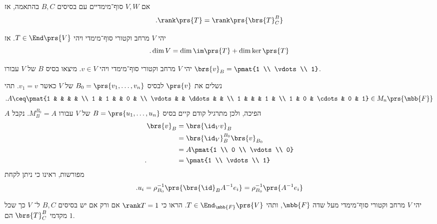 \documentclass[a4paper,10pt,twoside,openany]{book}
\begin{document}
\begin{remark}
אם
$V,W$
סוף־מימדיים עם בסיסים
$B,C$
בהתאמה, אז
\[\text{.} \rank\prs{T} = \rank\prs{\brs{T}^B_C}\]
\end{remark}

\begin{theorem}
יהי
$V$
מרחב וקטורי סוף־מימדי ויהי
$T \in \End\prs{V}$.
אז
\[\text{.} \dim V = \dim \im\prs{T} + \dim \ker\prs{T}\]
\end{theorem}

\begin{exercise}
יהי
$V$
מרחב וקטורי סוף־מימדי ויהי
$v \in V$.
מיצאו בסיס
$B$
של
$V$
עבורו
$\brs{v}_B = \pmat{1 \\ \vdots \\ 1}$.
\end{exercise}

\begin{solution}
נשלים את
$\prs{v}$
לבסיס
$B_0 = \prs{v_1, \ldots, v_n}$
של
$V$
כאשר
$v_1 = v$.
תהי
\begin{align*}
\text{.} A \ceq \pmat{1 & & & & \\
1 & 1 & & 0 & \\
\vdots & & \ddots & & \\
1 & & & 1 & \\
1 & 0 & \cdots & 0 & 1} \in M_n\prs{\mbb{F}}
\end{align*}
$A$
הפיכה, ולכן מתרגיל קודם קיים בסיס
$B = \prs{u_1, \ldots, u_n}$
של
$V$
עבורו
$M^{B_0}_B = A$.
נקבל
\begin{align*}
\brs{v}_B &= \brs{\id_V v}_B
\\&=
\brs{\id_V}^{B_0}_{B} \brs{v}_{B_0}
\\&= A \pmat{1 \\ 0 \\ \vdots \\ 0}
\\ \text{.} \hphantom{\brs{v}_B} &= \pmat{1 \\ \vdots \\ 1}
\end{align*}
מפורשות, ראינו כי ניתן לקחת
\[\text{.} u_i = \rho_{B_0}^{-1}\prs{\brs{\id}_B A^{-1} e_i} = \rho_{B_0}^{-1}\prs{A^{-1}e_i}\]
\end{solution}

\begin{exercise}
יהי
$V$
מרחב וקטורי סוף־מימדי מעל שדה
$\mbb{F}$,
ותהי
$T \in \End_{\mbb{F}}\prs{V}$.
הראו כי
$\rank T = 1$
אם ורק אם יש בסיסים
$B,C$
ל־%
$V$
כך שכל מקדמי
$\brs{T}^B_C$
הם
$1$.
\end{exercise}
\end{document}
